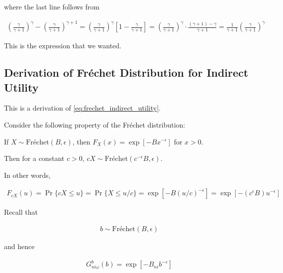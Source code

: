 \documentclass[10pt]{article}
\begin{document}
where the last line follows from

\begin{align}
    \left(\frac{\gamma}{\gamma+1}\right)^\gamma-\left(\frac{\gamma}{\gamma+1}\right)^{\gamma+1}=\left(\frac{\gamma}{\gamma+1}\right)^\gamma\left[1-\frac{\gamma}{\gamma+1}\right]=\left(\frac{\gamma}{\gamma+1}\right)^\gamma \cdot \frac{(\gamma+1)-\gamma}{\gamma+1}=\frac{1}{\gamma+1}\left(\frac{\gamma}{\gamma+1}\right)^\gamma
\end{align}

This is the expression that we wanted.


\subsection{Derivation of Fréchet Distribution for Indirect Utility}
\label{sec:frechet_indirect_utility}

This is a derivation of \eqref{eq:frechet_indirect_utility}.

Consider the following property of 
the Fréchet distribution:

\begin{notes}
    If $X \sim \text{Fréchet}(B, \epsilon)$, then $F_X(x)=\exp \left[-B x^{-\epsilon}\right]$ for $x>0$.

    Then for a constant $c>0$, $cX \sim \text{Fréchet}\left(c^{-\epsilon} B, \epsilon\right)$.
    
    In other words, 

    \begin{align}
        F_{c X}(u)=\operatorname{Pr}\{c X \leq u\}=\operatorname{Pr}\{X \leq u / c\}=\exp \left[-B(u / c)^{-\epsilon}\right]=\exp \left[-\left(c^{\epsilon} B\right) u^{-\epsilon}\right]
    \end{align}

\end{notes}


Recall that

\begin{align}
    b \sim \text{Fréchet}(B, \epsilon)
\end{align}

and hence

\begin{align}
    G^b_{n i \omega}(b)=\exp \left[-B_{n i} b^{-\epsilon}\right]
\end{align}
\end{document}
